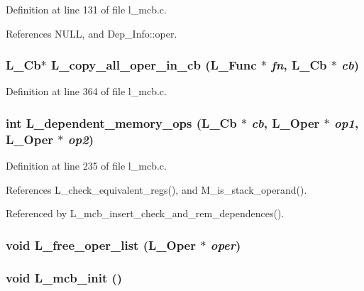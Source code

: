 Definition at line 131 of file l\_\-mcb.c.

References NULL, and Dep\_\-Info::oper.
\subsubsection{\setlength{\rightskip}{0pt plus 5cm}L\_\-Cb$\ast$ L\_\-copy\_\-all\_\-oper\_\-in\_\-cb (L\_\-Func $\ast$ {\em fn}, L\_\-Cb $\ast$ {\em cb})}\label{l__mcb_8h_d7ea649eb15d34bb940fea7fc01f55cf}




Definition at line 364 of file l\_\-mcb.c.
\subsubsection{\setlength{\rightskip}{0pt plus 5cm}int L\_\-dependent\_\-memory\_\-ops (L\_\-Cb $\ast$ {\em cb}, L\_\-Oper $\ast$ {\em op1}, L\_\-Oper $\ast$ {\em op2})}\label{l__mcb_8h_87c9795d2b98de45ce888950080a3f9f}




Definition at line 235 of file l\_\-mcb.c.

References L\_\-check\_\-equivalent\_\-regs(), and M\_\-is\_\-stack\_\-operand().

Referenced by L\_\-mcb\_\-insert\_\-check\_\-and\_\-rem\_\-dependences().
\subsubsection{\setlength{\rightskip}{0pt plus 5cm}void L\_\-free\_\-oper\_\-list (L\_\-Oper $\ast$ {\em oper})}\label{l__mcb_8h_9d53ae7d4aacc13a3cc3b63e4f4e4a2d}


\subsubsection{\setlength{\rightskip}{0pt plus 5cm}void L\_\-mcb\_\-init ()}\label{l__mcb_8h_072c41f7e97e34203efbc40f1714b2a7}




